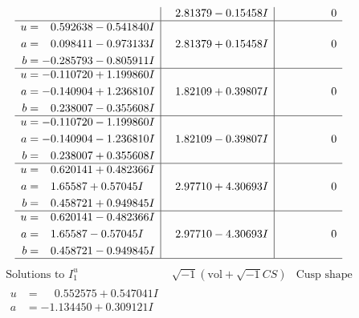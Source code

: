 \documentclass[1p]{elsarticle_modified}
\theoremstyle{definition}
\newcommand{\I}{\sqrt{-1}}
\begin{document}
$$\begin{array}{c|c|c}
 & \phantom{-}2.81379 - 0.15458 I & \phantom{-0.000000 } 0 \\ \hline\begin{aligned}
u &= \phantom{-}0.592638 - 0.541840 I \\
a &= \phantom{-}0.098411 - 0.973133 I \\
b &= -0.285793 - 0.805911 I\end{aligned}
 & \phantom{-}2.81379 + 0.15458 I & \phantom{-0.000000 } 0 \\ \hline\begin{aligned}
u &= -0.110720 + 1.199860 I \\
a &= -0.140904 + 1.236810 I \\
b &= \phantom{-}0.238007 - 0.355608 I\end{aligned}
 & \phantom{-}1.82109 + 0.39807 I & \phantom{-0.000000 } 0 \\ \hline\begin{aligned}
u &= -0.110720 - 1.199860 I \\
a &= -0.140904 - 1.236810 I \\
b &= \phantom{-}0.238007 + 0.355608 I\end{aligned}
 & \phantom{-}1.82109 - 0.39807 I & \phantom{-0.000000 } 0 \\ \hline\begin{aligned}
u &= \phantom{-}0.620141 + 0.482366 I \\
a &= \phantom{-}1.65587 + 0.57045 I \\
b &= \phantom{-}0.458721 + 0.949845 I\end{aligned}
 & \phantom{-}2.97710 + 4.30693 I & \phantom{-0.000000 } 0 \\ \hline\begin{aligned}
u &= \phantom{-}0.620141 - 0.482366 I \\
a &= \phantom{-}1.65587 - 0.57045 I \\
b &= \phantom{-}0.458721 - 0.949845 I\end{aligned}
 & \phantom{-}2.97710 - 4.30693 I & \phantom{-0.000000 } 0\\
 \hline 
 \end{array}$$\newpage$$\begin{array}{c|c|c}  
\text{Solutions to }I^u_{1}& \I (\text{vol} + \sqrt{-1}CS) & \text{Cusp shape}\\
 \hline 
\begin{aligned}
u &= \phantom{-}0.552575 + 0.547041 I \\
a &= -1.134450 + 0.309121 I \\

\end{aligned}
\end{array}$$
\end{document}
